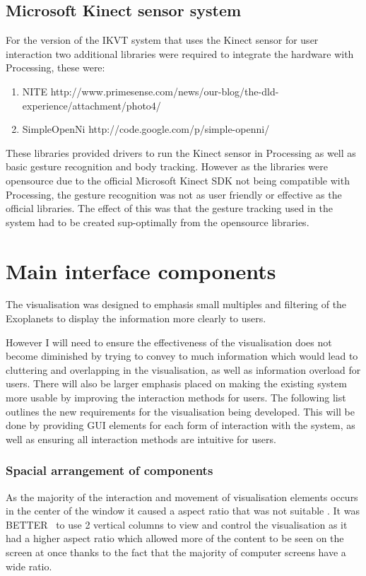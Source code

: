 \subsection{Microsoft Kinect sensor system}
For the version of the IKVT system that uses the Kinect sensor for user
interaction two additional libraries were required to integrate the hardware
with Processing, these were:
\begin{enumerate}
 \item NITE
http://www.primesense.com/news/our-blog/the-dld-experience/attachment/photo4/~
 \item SimpleOpenNi http://code.google.com/p/simple-openni/~
\end{enumerate}
These libraries provided drivers to run the Kinect sensor in Processing as well
as basic gesture recognition and body tracking. However as the libraries were
opensource due to the official Microsoft Kinect SDK not being compatible with
Processing, the gesture recognition was not as user friendly or effective as the
official libraries. The effect of this was that the gesture tracking used in the
system had to be created sup-optimally from the opensource libraries. 

\section{Main interface components}
The visualisation was designed to emphasis small multiples and filtering of the
Exoplanets to display the information more clearly to users.

However I will need to ensure the effectiveness of the visualisation does not
become diminished by trying to convey to much information which would lead to
cluttering and overlapping in the visualisation, as well as information overload
for users. There will also be larger emphasis placed on making the existing
system more usable by improving the interaction methods for users. The following
list outlines the new requirements for the visualisation being developed. This
will be done by providing GUI elements for each form of interaction with the
system, as well as ensuring all interaction methods are intuitive for users. 

\subsubsection{Spacial arrangement of components}
As the majority of the interaction and movement of visualisation elements occurs
in the center of the window it caused a aspect ratio that was not suitable . It
was BETTER~ to use 2 vertical columns to view and control the visualisation as
it had a higher aspect ratio which allowed more of the content to be seen on the
screen at once thanks to the fact that the majority of computer screens have a
wide ratio.

